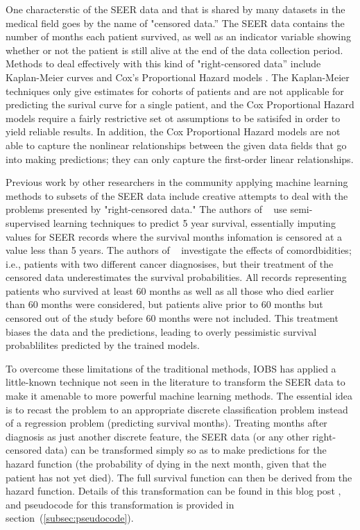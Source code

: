 \documentclass[a4paper,11pt]{article}
\begin{document}
One characterstic of the SEER data and that is shared by many datasets in the medical field 
goes by the name of "censored data.'' The SEER data contains the number of months each patient survived, as well as an indicator variable showing whether or not the patient is still alive at the end of the data collection period.
Methods to deal effectively with this kind of "right-censored data'' include Kaplan-Meier curves
and Cox's Proportional Hazard models \cite{cam}. The Kaplan-Meier techniques only give estimates for cohorts of patients and are not applicable for predicting the surival curve for a single patient, and the Cox Proportional Hazard models require a fairly restrictive set ot assumptions to be satisifed in order to yield reliable results. In addition, the Cox Proportional Hazard models are not able to capture the nonlinear relationships between the given data fields that go into making predictions; they can only capture the first-order linear relationships.

Previous work by other researchers in the community applying machine learning methods to subsets of the SEER data include creative attempts to deal with the problems presented by  "right-censored data." The authors of ~\cite{ISI:000337467400005} use semi-supervised learning techniques to predict 5 year survival, essentially imputing values for SEER records where the survival months infomation is censored at a value less than 5 years. The authors of ~\cite{ISI:000355882700012} investigate the effects of comordbidities; i.e., patients with two different cancer diagnosises, but their treatment of the censored data underestimates the survival probabilities. All records representing patients who survived at least 60 months as well as all those who died earlier than 60 months were considered, but patients alive prior to 60 months but censored out of the study before 60 months were not included. This treatment biases the data and the predictions, leading to overly pessimistic survival probablilites predicted by the trained models.



To overcome these limitations of the traditional methods, IOBS has applied a little-known technique not seen in the literature to transform the SEER data to make it amenable to more powerful machine learning methods. The essential idea is to recast the problem to an appropriate discrete classification problem instead of a regression problem (predicting survival months). Treating months after diagnosis as just another discrete feature, the SEER data (or any other right-censored data) can be transformed simply so as to make predictions for the hazard function
 (the probability of dying in the next month, given that the patient has not yet died).
The full survival function can then be derived from the hazard function.
Details of this transformation can be found in this blog post \cite{kuhn}, and pseudocode for this transformation is provided in section~(\ref{subsec:pseudocode}).
\end{document}
